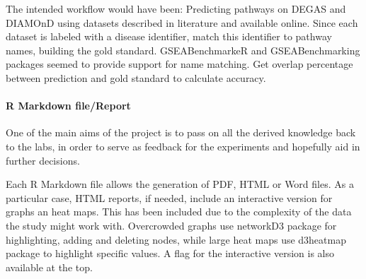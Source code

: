The intended workflow would have been:
Predicting pathways on DEGAS and DIAMOnD using datasets described in literature and available online.
Since each dataset is labeled with a disease identifier, match this identifier to pathway names, building the gold standard. GSEABenchmarkeR and GSEABenchmarking packages seemed to provide support for name matching.
Get overlap percentage between prediction and gold standard to calculate accuracy.

\paragraph{R Markdown file/Report}
One of the main aims of the project is to pass on all the derived knowledge back to the labs, in order to serve as feedback for the experiments and hopefully aid in further decisions.

Each R Markdown file allows the generation of PDF, HTML or Word files. As a particular case, HTML reports, if needed, include an interactive version for graphs an heat maps. This has been included due to the complexity of the data the study might work with. Overcrowded graphs use networkD3 package for highlighting, adding and deleting nodes, while large heat maps use d3heatmap package to highlight specific values. A flag for the interactive version is also available at the top.